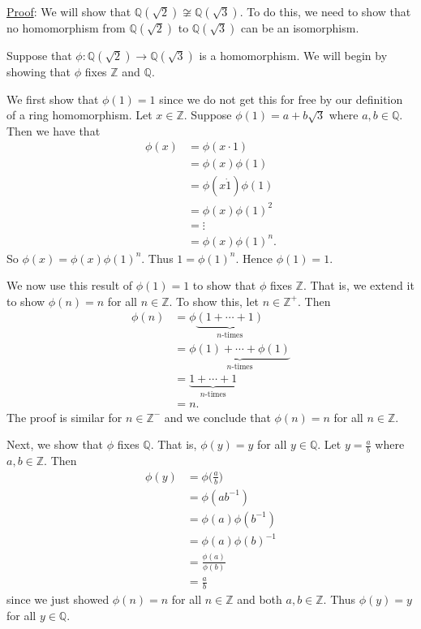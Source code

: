 \documentclass{article}
\begin{document}
\underline{Proof}: We will show that $\mathbb{Q}(\sqrt{2}) \not \cong \mathbb{Q}(\sqrt{3})$. To do this, we need to show that no homomorphism from $\mathbb{Q}(\sqrt{2})$ to $\mathbb{Q}(\sqrt{3})$ can be an isomorphism.

Suppose that $\phi : \mathbb{Q}(\sqrt{2}) \to \mathbb{Q}(\sqrt{3})$ is a homomorphism. We will begin by showing that $\phi$ fixes $\mathbb{Z}$ and $\mathbb{Q}$.

We first show that $\phi(1) = 1$ since we do not get this for free by our definition of a ring homomorphism. Let $x \in \mathbb{Z}$. Suppose $\phi(1) = a + b\sqrt{3}$ where $a, b \in \mathbb{Q}$. Then we have that
\begin{align*}
	\phi(x) &= \phi(x \cdot 1) \\
	&= \phi(x) \phi(1) \\
	&= \phi(x \dot 1) \phi(1) \\
	&= \phi(x) \phi(1)^2 \\
	&= \vdots \\
	&= \phi(x) \phi(1)^n.
\end{align*}
So $\phi(x) = \phi(x) \phi(1)^n$. Thus $1 = \phi(1)^n$. Hence $\phi(1) = 1$. 

We now use this result of $\phi(1) = 1$ to show that $\phi$ fixes $\mathbb{Z}$. That is, we extend it to show $\phi(n) = n$ for all $n \in \mathbb{Z}$. To show this, let $n \in \mathbb{Z^+}$. Then
\begin{align*}
	\phi(n) &= \phi \underbrace{(1 + \cdots + 1)}_{n \text {-times}} \\
	&= \underbrace{\phi(1) + \cdots + \phi(1)}_{n \text {-times}} \\
	&= \underbrace{1 + \cdots + 1}_{n \text {-times}} \\
	&= n.
\end{align*}
The proof is similar for $n \in \mathbb{Z^-}$ and we conclude that $\phi(n) = n$ for all $n \in \mathbb{Z}$.

Next, we show that $\phi$ fixes $\mathbb{Q}$. That is, $\phi(y) = y$ for all $y \in \mathbb{Q}$. Let $y = \frac ab$ where $a, b \in \mathbb{Z}$. Then 
\begin{align*}
	\phi(y) &= \phi\big(\frac ab\big) \\
	&= \phi(ab^{-1}) \\
	&= \phi(a) \phi(b^{-1}) \\
	&= \phi(a) \phi(b)^{-1} \\
	&= \frac{\phi(a)}{\phi(b)} \\
	&= \frac ab
\end{align*}
since we just showed $\phi(n) = n$ for all $n \in \mathbb{Z}$ and both $a, b \in \mathbb{Z}$. Thus $\phi(y) = y$ for all $y \in \mathbb{Q}$.
\end{document}
